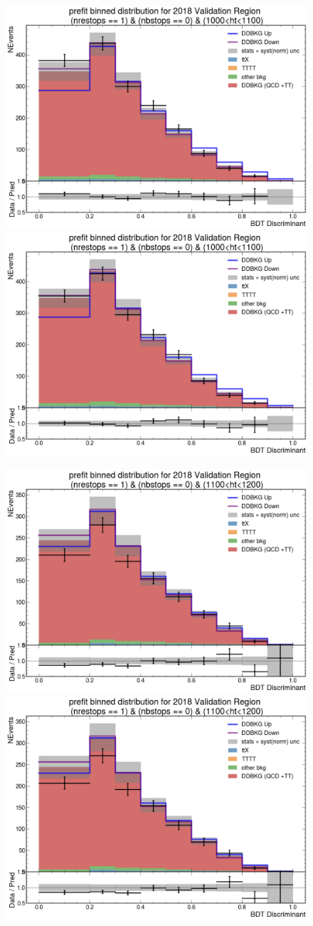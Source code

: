 \documentclass[twoside]{article}
\begin{document}
\begin{figure}[!t]
    \centering
    \includegraphics[width=.45\columnwidth]{plots/Trigger/TriggerReview/eff4.png}
    \includegraphics[width=.45\columnwidth]{plots/Trigger/TriggerReview/SF4.png}

    \includegraphics[width=.45\columnwidth]{plots/Trigger/TriggerReview/eff5.png}
    \includegraphics[width=.45\columnwidth]{plots/Trigger/TriggerReview/SF5.png}


\end{figure}
\end{document}
